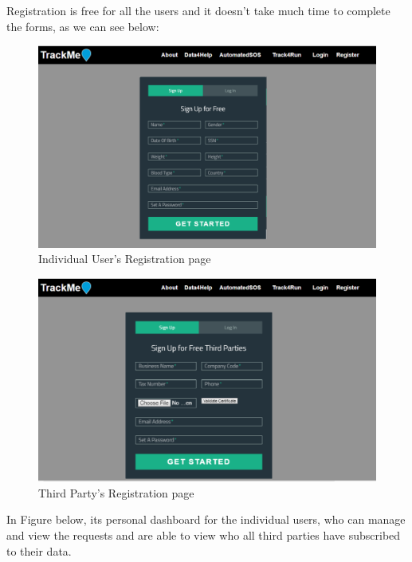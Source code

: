 \documentclass[12pt]{report}
\begin{document}
Registration is free for all the users and it doesn't take much time to complete the forms, as we can see below:

\begin{figure}[H]
\centering
\includegraphics[scale=0.35]{../Assets/Register.png}
\caption[UI: Individual User's Registration page]{Individual User's Registration page}
\label{fig:Register}
\end{figure}

\begin{figure}[H]
\centering
\includegraphics[scale=0.35]{../Assets/Register_third_party.png}
\caption[UI: Third Party's Registration page]{Third Party's Registration page}
\label{fig:Register_third_party}
\end{figure}

In Figure below, its personal dashboard for the individual users, who can manage and view the requests and are able to view who all third parties have subscribed to their data.
\end{document}
